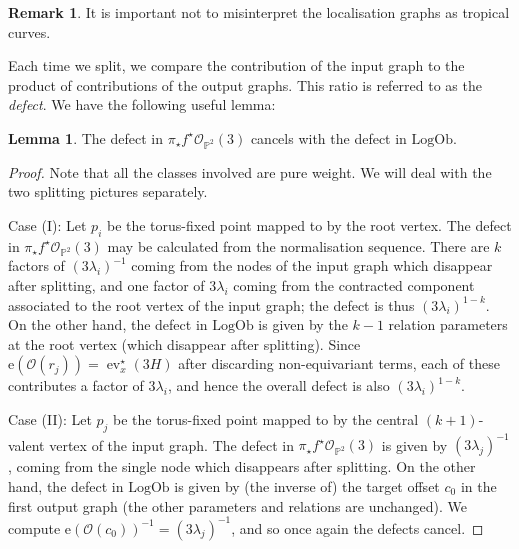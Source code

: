 \documentclass[11pt]{amsart}
\theoremstyle{definition}
\theoremstyle{definition}
\newtheorem{lemma}[theorem]{Lemma}
\newtheorem{remark}[theorem]{Remark}
\DeclareMathOperator{\ev}{ev}
\newcommand{\e}{\mathrm{e}}
\newcommand{\PP}{\mathbb{P}}
\newcommand{\OO}{\mathcal{O}}
\newcommand{\LogOb}{\mathrm{LogOb}}
\begin{document}
\begin{center}
\end{center}

\begin{remark} It is important not to misinterpret the localisation graphs as tropical curves.\end{remark}

Each time we split, we compare the contribution of the input graph to the product of contributions of the output graphs. This ratio is referred to as the \emph{defect}. We have the following useful lemma:

\begin{lemma} The defect in $\pi_\star f^\star \OO_{\PP^2}(3)$ cancels with the defect in $\LogOb$.\end{lemma}

\begin{proof} Note that all the classes involved are pure weight. We will deal with the two splitting pictures separately.

Case (I): Let $p_i$ be the torus-fixed point mapped to by the root vertex. The defect in $\pi_\star f^\star \OO_{\PP^2}(3)$ may be calculated from the normalisation sequence. There are $k$ factors of $(3\lambda_i)^{-1}$ coming from the nodes of the input graph which disappear after splitting, and one factor of $3\lambda_i$ coming from the contracted component associated to the root vertex of the input graph; the defect is thus $(3\lambda_i)^{1-k}$. On the other hand, the defect in $\LogOb$ is given by the $k-1$ relation parameters at the root vertex (which disappear after splitting). Since $\e(\OO(r_j)) = \ev_x^\star (3H)$ after discarding non-equivariant terms, each of these contributes a factor of $3\lambda_i$, and hence the overall defect is also $(3\lambda_i)^{1-k}$.

Case (II): Let $p_j$ be the torus-fixed point mapped to by the central $(k+1)$-valent vertex of the input graph. The defect in $\pi_\star f^\star \OO_{\PP^2}(3)$ is given by $(3\lambda_j)^{-1}$, coming from the single node which disappears after splitting. On the other hand, the defect in $\LogOb$ is given by (the inverse of) the target offset $c_0$ in the first output graph (the other parameters and relations are unchanged). We compute $\e(\OO(c_0))^{-1} = (3\lambda_j)^{-1}$, and so once again the defects cancel.\end{proof}
\end{document}
